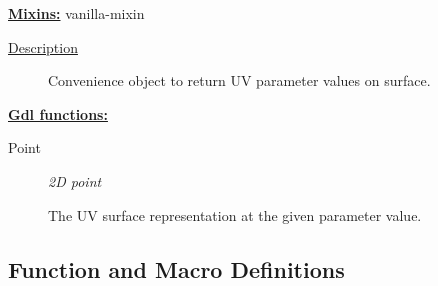 \documentclass [11pt]{book}
\begin{document}
\begin{itemize}
\textbf{
\underline{Mixins:}} vanilla-mixin





\begin{description}

\item [
\underline{Description}]


Convenience object to return UV parameter values on surface.



\end{description}








\textbf{
\underline{Gdl functions:}}

\begin{description}

\item [Point]
\emph{2D point}

 The UV surface representation at the given parameter value.




\end{description}







\end{itemize}



\subsection{Function and Macro Definitions}

\label{subsec:functionandmacrodefinitions}
\end{document}
